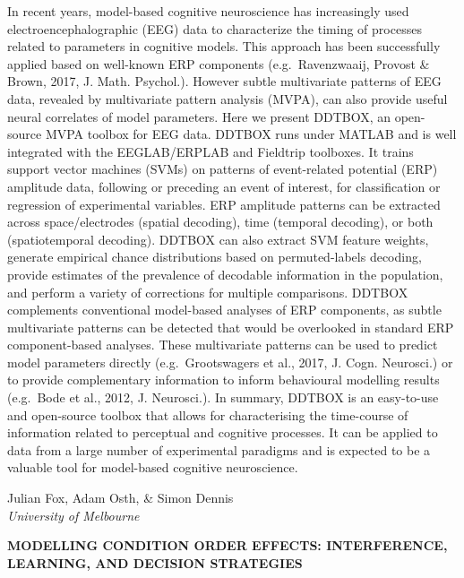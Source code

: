 \documentclass[]{article}
\begin{document}
In recent years, model-based cognitive neuroscience has increasingly
used electroencephalographic (EEG) data to characterize the timing of
processes related to parameters in cognitive models. This approach has
been successfully applied based on well-known ERP components
(e.g.~Ravenzwaaij, Provost \& Brown, 2017, J. Math. Psychol.). However
subtle multivariate patterns of EEG data, revealed by multivariate
pattern analysis (MVPA), can also provide useful neural correlates of
model parameters. Here we present DDTBOX, an open-source MVPA toolbox
for EEG data. DDTBOX runs under MATLAB and is well integrated with the
EEGLAB/ERPLAB and Fieldtrip toolboxes. It trains support vector machines
(SVMs) on patterns of event-related potential (ERP) amplitude data,
following or preceding an event of interest, for classification or
regression of experimental variables. ERP amplitude patterns can be
extracted across space/electrodes (spatial decoding), time (temporal
decoding), or both (spatiotemporal decoding). DDTBOX can also extract
SVM feature weights, generate empirical chance distributions based on
permuted-labels decoding, provide estimates of the prevalence of
decodable information in the population, and perform a variety of
corrections for multiple comparisons. DDTBOX complements conventional
model-based analyses of ERP components, as subtle multivariate patterns
can be detected that would be overlooked in standard ERP component-based
analyses. These multivariate patterns can be used to predict model
parameters directly (e.g.~Grootswagers et al., 2017, J. Cogn. Neurosci.)
or to provide complementary information to inform behavioural modelling
results (e.g.~Bode et al., 2012, J. Neurosci.). In summary, DDTBOX is an
easy-to-use and open-source toolbox that allows for characterising the
time-course of information related to perceptual and cognitive
processes. It can be applied to data from a large number of experimental
paradigms and is expected to be a valuable tool for model-based
cognitive neuroscience.\\
\pagebreak  

Julian Fox, Adam Osth, \& Simon Dennis\\
\emph{University of Melbourne}

\textbf{MODELLING CONDITION ORDER EFFECTS: INTERFERENCE, LEARNING, AND
DECISION STRATEGIES}
\end{document}
